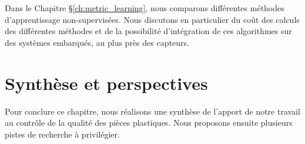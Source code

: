 Dans le Chapitre §\ref{ch:metric_learning}, nous comparons différentes méthodes d'apprentissage non-supervisées.
Nous discutons en particulier du coût des calculs des différentes méthodes et de la possibilité d'intégration de ces algorithmes sur des systèmes embarqués, au plus près des capteurs.

% 
%
%
%
%
%
%
%

\section{Synthèse et perspectives}  \label{measure_perspective}
Pour conclure ce chapitre, nous réalisons une synthèse de l'apport de notre travail au contrôle de la qualité des pièces plastiques.
Nous proposons ensuite plusieurs pistes de recherche à privilégier.

